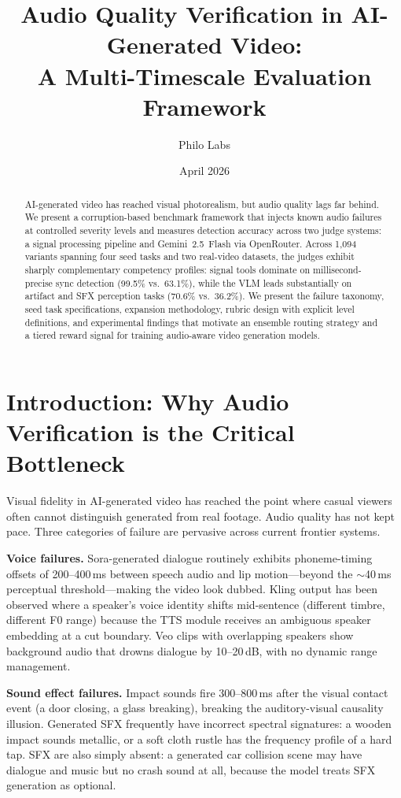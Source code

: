 \documentclass[11pt]{article}
\title{Audio Quality Verification in AI-Generated Video: \\
A Multi-Timescale Evaluation Framework}
\author{Philo Labs}
\date{April 2026}
\begin{document}
\maketitle

\begin{abstract}
AI-generated video has reached visual photorealism, but audio quality lags far behind.
We present a corruption-based benchmark framework that injects known audio failures at
controlled severity levels and measures detection accuracy across two judge systems: a
signal processing pipeline and Gemini~2.5~Flash via OpenRouter. Across 1,094 variants
spanning four seed tasks and two real-video datasets, the judges exhibit sharply
complementary competency profiles: signal tools dominate on millisecond-precise sync
detection (99.5\% vs.\ 63.1\%), while the VLM leads substantially on artifact and SFX
perception tasks (70.6\% vs.\ 36.2\%). We present the failure taxonomy, seed task
specifications, expansion methodology, rubric design with explicit level definitions, and
experimental findings that motivate an ensemble routing strategy and a tiered reward
signal for training audio-aware video generation models.
\end{abstract}

\section{Introduction: Why Audio Verification is the Critical Bottleneck}

Visual fidelity in AI-generated video has reached the point where casual viewers often
cannot distinguish generated from real footage. Audio quality has not kept pace. Three
categories of failure are pervasive across current frontier systems.

\textbf{Voice failures.} Sora-generated dialogue routinely exhibits phoneme-timing offsets
of 200--400\,ms between speech audio and lip motion---beyond the $\sim$40\,ms perceptual
threshold---making the video look dubbed. Kling output has been observed where a
speaker's voice identity shifts mid-sentence (different timbre, different F0 range)
because the TTS module receives an ambiguous speaker embedding at a cut boundary.
Veo clips with overlapping speakers show background audio that drowns dialogue by 10--20\,dB,
with no dynamic range management.

\textbf{Sound effect failures.} Impact sounds fire 300--800\,ms after the visual contact
event (a door closing, a glass breaking), breaking the auditory-visual causality illusion.
Generated SFX frequently have incorrect spectral signatures: a wooden impact sounds
metallic, or a soft cloth rustle has the frequency profile of a hard tap. SFX are also
simply absent: a generated car collision scene may have dialogue and music but no crash
sound at all, because the model treats SFX generation as optional.
\end{document}

